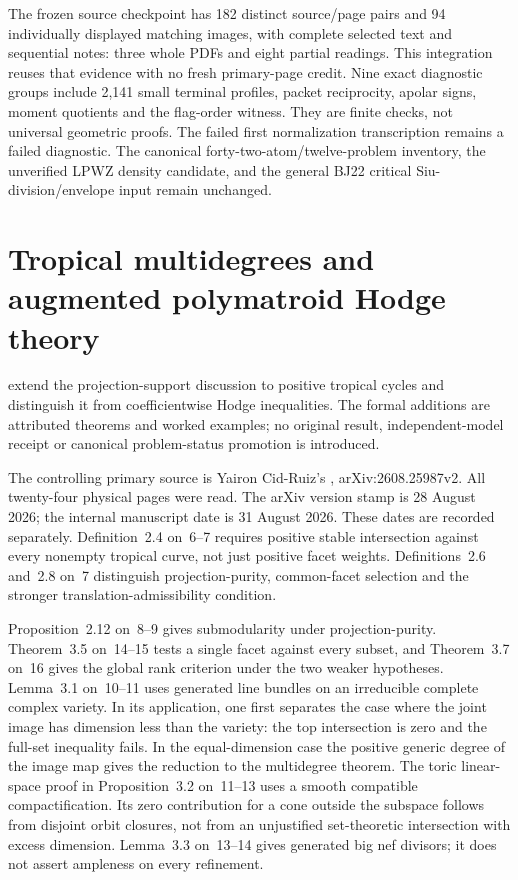 The frozen source checkpoint has 182 distinct source/page pairs
and 94 individually displayed matching images, with complete
selected text and sequential notes: three whole PDFs and eight
partial readings. This integration reuses that evidence with no
fresh primary-page credit. Nine exact diagnostic groups include
2,141 small terminal profiles, packet reciprocity, apolar signs,
moment quotients and the flag-order witness. They are finite
checks, not universal geometric proofs. The failed first
normalization transcription remains a failed diagnostic.
The canonical forty-two-atom/twelve-problem inventory, the
unverified LPWZ density candidate, and the general BJ22
critical Siu-division/envelope input remain unchanged.

\section{Tropical multidegrees and augmented polymatroid Hodge theory}
\label{sec:appL-tropical-multidegree-sources}

extend the projection-support discussion to positive tropical
cycles and distinguish it from coefficientwise Hodge inequalities.
The formal additions are attributed theorems and worked examples;
no original result, independent-model receipt or canonical
problem-status promotion is introduced.

The controlling primary source is Yairon Cid-Ruiz's
\cite{CidRuiz26TropicalMultidegreesV2}, arXiv:2608.25987v2.
All twenty-four physical pages were read. The arXiv version
stamp is 28 August 2026; the internal manuscript date is
31 August 2026. These dates are recorded separately.
Definition~2.4 on~6--7 requires positive stable intersection
against every nonempty tropical curve, not just positive
facet weights. Definitions~2.6 and~2.8 on~7 distinguish
projection-purity, common-facet selection and the stronger
translation-admissibility condition.

Proposition~2.12 on~8--9 gives submodularity under
projection-purity. Theorem~3.5 on~14--15 tests a single
facet against every subset, and Theorem~3.7 on~16 gives
the global rank criterion under the two weaker hypotheses.
Lemma~3.1 on~10--11 uses generated line bundles on an
irreducible complete complex variety. In its application,
one first separates the case where the joint image has
dimension less than the variety: the top intersection is
zero and the full-set inequality fails. In the equal-dimension
case the positive generic degree of the image map gives
the reduction to the multidegree theorem. The toric
linear-space proof in Proposition~3.2 on~11--13 uses a
smooth compatible compactification. Its zero contribution
for a cone outside the subspace follows from disjoint
orbit closures, not from an unjustified set-theoretic
intersection with excess dimension. Lemma~3.3 on~13--14
gives generated big nef divisors; it does not assert
ampleness on every refinement.

